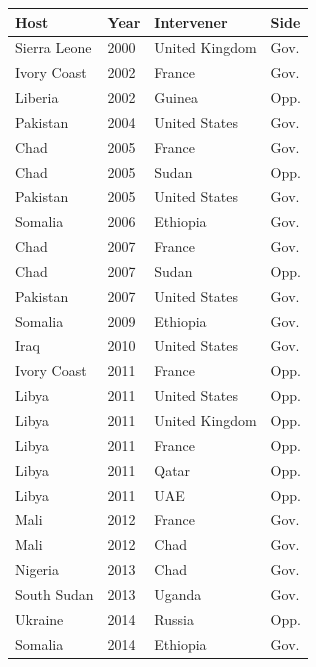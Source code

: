 \begin{table}[p]
  \centering
  \footnotesize
  \begin{tabular}{@{}llll@{}}
    \toprule
    \textbf{Host} & \textbf{Year} & \textbf{Intervener} & \textbf{Side} \\
    \midrule
    Sierra Leone   & 2000 & United Kingdom  & Gov. \\
    Ivory Coast    & 2002 & France          & Gov. \\
    Liberia        & 2002 & Guinea          & Opp. \\
    Pakistan       & 2004 & United States   & Gov. \\
    Chad           & 2005 & France          & Gov. \\
    Chad           & 2005 & Sudan           & Opp. \\
    Pakistan       & 2005 & United States   & Gov. \\
    Somalia        & 2006 & Ethiopia        & Gov. \\
    Chad           & 2007 & France          & Gov. \\
    Chad           & 2007 & Sudan           & Opp. \\
    Pakistan       & 2007 & United States   & Gov. \\
    Somalia        & 2009 & Ethiopia        & Gov. \\
    Iraq           & 2010 & United States   & Gov. \\
    Ivory Coast    & 2011 & France          & Opp. \\
    Libya          & 2011 & United States   & Opp. \\
    Libya          & 2011 & United Kingdom  & Opp. \\
    Libya          & 2011 & France          & Opp. \\
    Libya          & 2011 & Qatar           & Opp. \\
    Libya          & 2011 & UAE             & Opp. \\
    Mali           & 2012 & France          & Gov. \\
    Mali           & 2012 & Chad            & Gov. \\
    Nigeria        & 2013 & Chad            & Gov. \\
    South Sudan    & 2013 & Uganda          & Gov. \\
    Ukraine        & 2014 & Russia          & Opp. \\
    Somalia        & 2014 & Ethiopia        & Gov. \\

\end{tabular}
\end{table}
